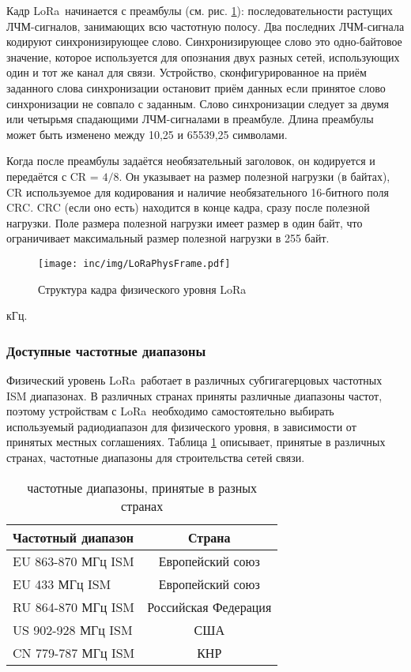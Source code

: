 Кадр LoRa\texttrademark~начинается с преамбулы (см. рис. 
\ref{fig:loraphysframe}): 
последовательности растущих ЛЧМ-сигналов, занимающих всю частотную полосу.
Два последних ЛЧМ-сигнала кодируют синхронизирующее слово.
Синхронизирующее слово это одно-байтовое значение, которое используется для 
опознания двух разных сетей, использующих один и тот же канал для связи. 
Устройство, сконфигурированное на приём заданного слова синхронизации остановит 
приём данных если принятое слово синхронизации не совпало с заданным.
Слово синхронизации следует за двумя или четырьмя спадающими ЛЧМ-сигналами в 
преамбуле.
Длина преамбулы может быть изменено между 10,25 и 65539,25 символами.

Когда после преамбулы задаётся необязательный заголовок, он кодируется и 
передаётся с CR = $4/8$.
Он указывает на размер полезной нагрузки (в байтах), CR используемое для 
кодирования и наличие необязательного 16-битного поля CRC.
CRC (если оно есть) находится в конце кадра, сразу после полезной нагрузки.
Поле размера полезной нагрузки имеет размер в один байт, что ограничивает 
максимальный размер полезной нагрузки в 255 байт.

\begin{figure}[!h]
  \centering
  \texttt{[image: inc/img/LoRaPhysFrame.pdf]}
  \caption{Структура кадра физического уровня LoRa\texttrademark}
  \label{fig:loraphysframe}
\end{figure}

кГц.

\subsubsection{Доступные частотные диапазоны}

Физический уровень LoRa\texttrademark~работает в различных субгигагерцовых 
частотных ISM 
диапазонах.
В различных странах приняты различные диапазоны частот, поэтому устройствам с 
LoRa\texttrademark~необходимо самостоятельно выбирать используемый 
радиодиапазон для 
физического уровня, в зависимости от принятых местных соглашениях. 
Таблица \ref{tab:ismbands} описывает, принятые в различных странах, частотные 
диапазоны для строительства сетей связи.

\begin{table}[ht]
  \caption{частотные диапазоны, принятые в разных странах}
  \begin{tabular}{|l|c|}
  \hline
	  Частотный диапазон & Страна\\
  \hline
	  EU 863-870 МГц ISM & Европейский союз\\
  \hline
	  EU 433 МГц ISM & Европейский союз\\
  \hline
	  RU 864-870 МГц ISM & Российская Федерация\\
  \hline
	  US 902-928 МГц ISM & США\\
  \hline
	  CN 779-787 МГц ISM & КНР\\
  \hline
  \end{tabular}
  \label{tab:ismbands}
\end{table}


